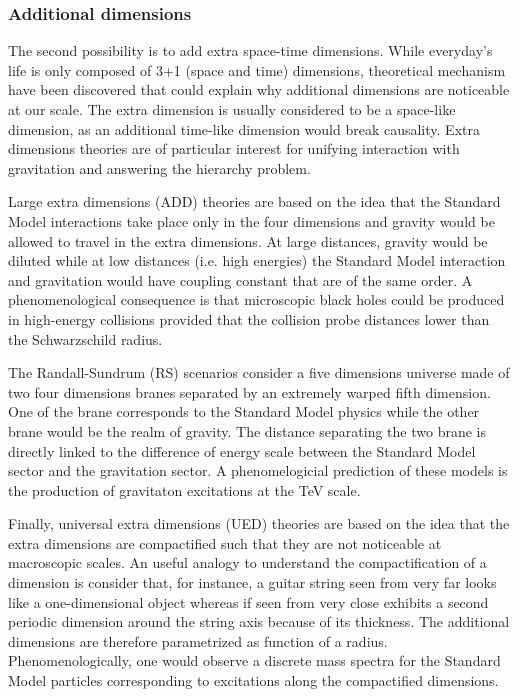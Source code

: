             \subsubsection{Additional dimensions}

        The second possibility is to add extra space-time dimensions. While everyday's life
        is only composed of 3+1 (space and time) dimensions, theoretical mechanism have been
        discovered that could explain why additional dimensions are noticeable at our scale.
        The extra dimension is usually considered to be a space-like dimension, as an
        additional time-like dimension would break causality. Extra dimensions theories
        are of particular interest for unifying interaction with gravitation and answering
        the hierarchy problem.

        Large extra dimensions (ADD) theories are based on the idea that the Standard Model
        interactions take place only in the four dimensions and gravity would be
        allowed to travel in the extra dimensions. At large distances, gravity would
        be diluted while at low distances (i.e. high energies) the Standard Model interaction
        and gravitation would have coupling constant that are of the same order. A phenomenological
        consequence is that microscopic black holes could be produced in high-energy collisions
        provided that the collision probe distances lower than the Schwarzschild radius.

        The Randall-Sundrum (RS) scenarios consider a five dimensions universe made of two
        four dimensions branes separated by an extremely warped fifth dimension. One of
        the brane corresponds to the Standard Model physics while the other brane would be
        the realm of gravity. The distance separating the two brane is directly linked to
        the difference of energy scale between the Standard Model sector and the gravitation
        sector. A phenomelogicial prediction of these models is the production of gravitaton
        excitations at the TeV scale.

        Finally, universal extra dimensions (UED) theories are based on the idea that
        the extra dimensions are compactified such that they are not noticeable at macroscopic
        scales. An useful analogy to understand the compactification of a dimension is
        consider that, for instance, a guitar string seen from very far looks like a one-dimensional
        object whereas if seen from very close exhibits a second periodic dimension around
        the string axis because of its thickness. The additional dimensions are therefore
        parametrized as function of a radius. Phenomenologically, one would observe a discrete
        mass spectra for the Standard Model particles corresponding to excitations along
        the compactified dimensions.

